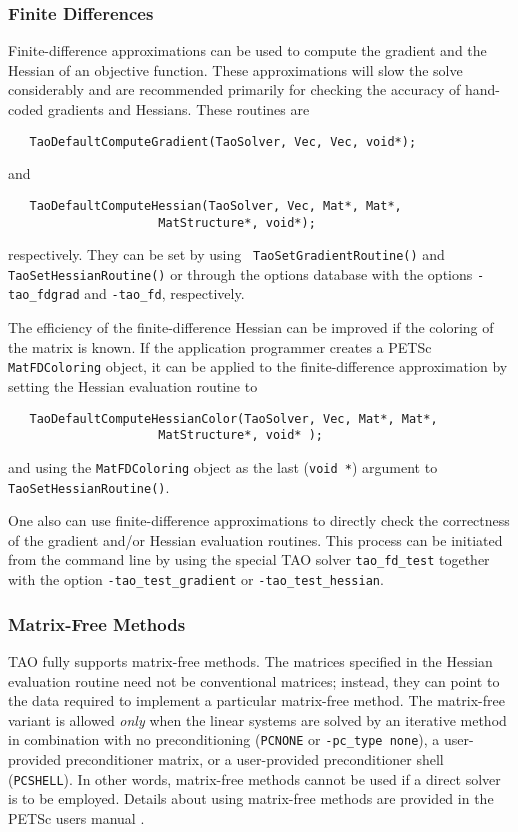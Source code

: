 \subsubsection{Finite Differences} 
Finite-difference approximations can be used to compute the gradient and the
Hessian of an objective
function.  These approximations will slow the solve considerably and 
are recommended primarily  
for checking the accuracy of hand-coded gradients and Hessians.
These routines are
\begin{verbatim}
   TaoDefaultComputeGradient(TaoSolver, Vec, Vec, void*);
\end{verbatim}
and 
\begin{verbatim}
   TaoDefaultComputeHessian(TaoSolver, Vec, Mat*, Mat*, 
                     MatStructure*, void*);
\end{verbatim}
respectively. They can be set by using {\tt
TaoSetGradientRoutine()} and 
{\tt TaoSetHessianRoutine()} or through the options database with the
options {\tt -tao\_fdgrad} and {\tt -tao\_fd}, respectively.

The efficiency of the finite-difference Hessian can be improved if the
coloring of the matrix is known.  If the application programmer creates
a PETSc {\tt MatFDColoring} object, it can be applied to the finite-difference
approximation by setting the Hessian evaluation routine to
\begin{verbatim}
   TaoDefaultComputeHessianColor(TaoSolver, Vec, Mat*, Mat*, 
                     MatStructure*, void* );
\end{verbatim}
and using the {\tt MatFDColoring} object as
the last ({\tt void *}) argument to {\tt TaoSetHessianRoutine()}.

One also can use finite-difference approximations to directly check
the correctness of the gradient and/or Hessian evaluation routines.
This process can be initiated from the command line by using the special 
TAO solver 
{\tt tao\_fd\_test} together with the option
{\tt -tao\_test\_gradient} or {\tt -tao\_test\_hessian}.

\subsubsection{Matrix-Free Methods}
TAO fully supports matrix-free methods. The matrices specified in the
Hessian evaluation routine need not be conventional
matrices; instead, they can point to the data required to implement a
particular matrix-free method.  The matrix-free variant is allowed
{\em only} when the linear systems are solved by an iterative method
in combination with no preconditioning ({\tt PCNONE} or {\tt -pc\_type none}),
a user-provided preconditioner matrix, or a user-provided preconditioner
shell ({\tt PCSHELL}). In other words,
matrix-free methods cannot be used if a direct solver is to 
be employed.  %
Details about using matrix-free methods are provided in the
PETSc users manual \cite{petsc-user-ref}.


